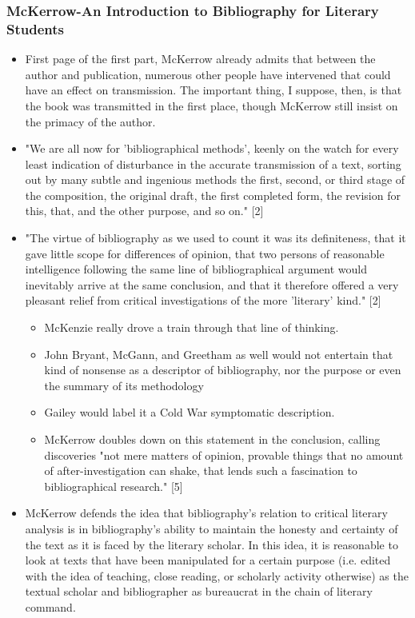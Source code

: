 \documentclass[course, english]{Notes}
\newcommand{\n}{\scalebox{2}{\textbf{\framebox{$\aleph$} } } }
\begin{document}
\subsubsection{McKerrow-An Introduction to Bibliography for Literary Students}
\begin{itemize}
\item{\n First page of the first part, McKerrow already admits that between the author and publication, numerous other people have intervened that could have an effect on transmission. The important thing, I suppose, then, is that the book was transmitted in the first place, though McKerrow still insist on the primacy of the author.}
\item{"We are all now for 'bibliographical methods', keenly on the watch for every least indication of disturbance in the accurate transmission of a text, sorting out by many subtle and ingenious methods the first, second, or third stage of the composition, the original draft, the first completed form, the revision for this, that, and the other purpose, and so on." [2]}
\item{"The virtue of bibliography as we used to count it was its definiteness, that it gave little scope for differences of opinion, that two persons of reasonable intelligence following the same line of bibliographical argument would inevitably arrive at the same conclusion, and that it therefore offered a very pleasant relief from critical investigations of the more 'literary' kind." [2]}
\begin{itemize}
\item \n McKenzie really drove a train through that line of thinking.
\item \n John Bryant, McGann, and Greetham as well would not entertain that kind of nonsense as a descriptor of bibliography, nor the purpose or even the summary of its methodology
\item \n Gailey would label it a Cold War symptomatic description.
\item McKerrow doubles down on this statement in the conclusion, calling discoveries "not mere matters of opinion, provable things that no amount of after-investigation can shake, that lends such a fascination to bibliographical research." [5]
\end{itemize}
\item \begin{outline} \1 \n McKerrow defends the idea that bibliography's relation to critical literary analysis is in bibliography's ability to maintain the honesty and certainty of the text as it is faced by the literary scholar. In this idea, it is reasonable to look at texts that have been manipulated for a certain purpose (i.e. edited with the idea of teaching, close reading, or scholarly activity otherwise) as the textual scholar and bibliographer as bureaucrat in the chain of literary command. 

\end{outline}
\end{itemize}
\end{document}
